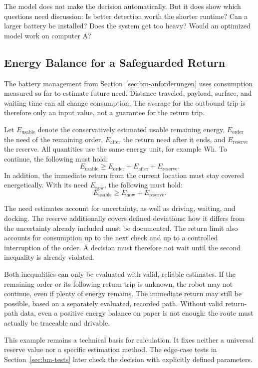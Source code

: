 The model does not make the decision automatically. But it does show which questions need discussion: Is better detection worth the shorter runtime? Can a larger battery be installed? Does the system get too heavy? Would an optimized model work on computer A?

\subsection{Energy Balance for a Safeguarded Return}
\label{sec:bm-energie}
The battery management from Section~\ref{sec:bm-anforderungen} uses consumption measured so far to estimate future need. Distance traveled, payload, surface, and waiting time can all change consumption. The average for the outbound trip is therefore only an input value, not a guarantee for the return trip.

Let \(E_{\mathrm{usable}}\) denote the conservatively estimated usable remaining energy, \(E_{\mathrm{order}}\) the need of the remaining order, \(E_{\mathrm{after}}\) the return need after it ends, and \(E_{\mathrm{reserve}}\) the reserve. All quantities use the same energy unit, for example Wh. To continue, the following must hold:
\[
E_{\mathrm{usable}} \geq E_{\mathrm{order}} + E_{\mathrm{after}} + E_{\mathrm{reserve}}.
\]
In addition, the immediate return from the current location must stay covered energetically. With its need \(E_{\mathrm{now}}\), the following must hold:
\[
E_{\mathrm{usable}} \geq E_{\mathrm{now}} + E_{\mathrm{reserve}}.
\]

The need estimates account for uncertainty, as well as driving, waiting, and docking. The reserve additionally covers defined deviations; how it differs from the uncertainty already included must be documented. The return limit also accounts for consumption up to the next check and up to a controlled interruption of the order. A decision must therefore not wait until the second inequality is already violated.

Both inequalities can only be evaluated with valid, reliable estimates. If the remaining order or its following return trip is unknown, the robot may not continue, even if plenty of energy remains. The immediate return may still be possible, based on a separately evaluated, recorded path. Without valid return-path data, even a positive energy balance on paper is not enough: the route must actually be traceable and drivable.

This example remains a technical basis for calculation. It fixes neither a universal reserve value nor a specific estimation method. The edge-case tests in Section~\ref{sec:bm-tests} later check the decision with explicitly defined parameters.


